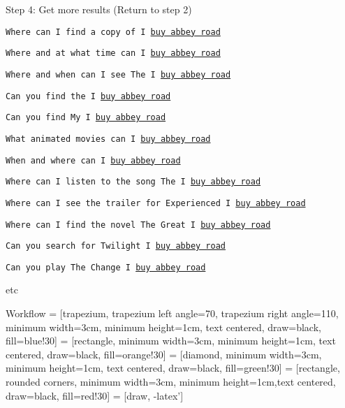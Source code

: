 \documentclass[12pt]{beamer}
\begin{document}
\begin{frame}{Step 4: Get more results (Return to step 2)}

  
\texttt{Where can I find a copy of I \underline{buy abbey road}}

\texttt{Where and at what time can I \underline{buy abbey road}}

\texttt{Where and when can I see The I \underline{buy abbey road}}

\texttt{Can you find the I \underline{buy abbey road}}

\texttt{Can you find My I \underline{buy abbey road}}

\texttt{What animated movies can I \underline{buy abbey road}}

\texttt{When and where can I \underline{buy abbey road}}

\texttt{Where can I listen to the song The I \underline{buy abbey road}}

\texttt{Where can I see the trailer for Experienced I \underline{buy abbey
  road}}

\texttt{Where can I find the novel The Great I \underline{buy abbey road}}

\texttt{Can you search for Twilight I \underline{buy abbey road}}

\texttt{Can you play The Change I \underline{buy abbey road}}


etc

\end{frame}

  \begin{frame}{Workflow}
     = [trapezium, trapezium left angle=70, trapezium right angle=110, minimum width=3cm, minimum height=1cm, text centered, draw=black, fill=blue!30]
     = [rectangle, minimum width=3cm, minimum height=1cm, text centered, draw=black, fill=orange!30]
     = [diamond, minimum width=3cm, minimum height=1cm, text centered, draw=black, fill=green!30]
     = [rectangle, rounded corners, minimum width=3cm, minimum height=1cm,text centered, draw=black, fill=red!30]
     = [draw, -latex']

\centering
  \end{frame}
\end{document}
